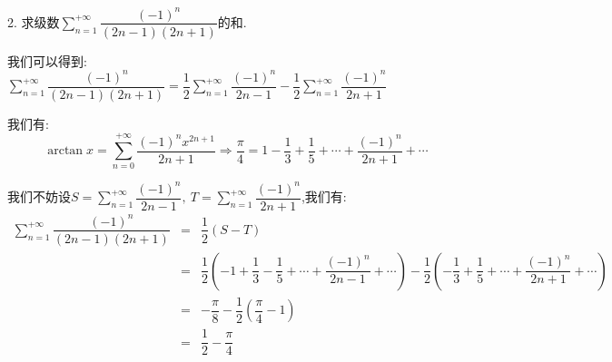 2. 求级数$\sum\limits_{n=1}^{+\infty}\dfrac{(-1)^n}{(2n-1)(2n+1)}$的和.
\begin{solution}
	
	我们可以得到: $\sum\limits_{n=1}^{+\infty}\dfrac{(-1)^n}{(2n-1)(2n+1)}=\dfrac{1}{2}\sum\limits_{n=1}^{+\infty}\dfrac{(-1)^n}{2n-1}-\dfrac{1}{2}\sum\limits_{n=1}^{+\infty}\dfrac{(-1)^n}{2n+1}$
	
	我们有: 
	$$\arctan x=\sum\limits_{n=0}^{+\infty}\dfrac{(-1)^nx^{2n+1}}{2n+1}\Rightarrow \dfrac{\pi}{4}=1-\dfrac{1}{3}+\dfrac{1}{5}+\cdots+\dfrac{(-1)^n}{2n+1}+\cdots$$
	
	我们不妨设$S=\sum\limits_{n=1}^{+\infty}\dfrac{(-1)^n}{2n-1},\ T=\sum\limits_{n=1}^{+\infty}\dfrac{(-1)^n}{2n+1}$,我们有: 
	\begin{eqnarray*}
		\sum\limits_{n=1}^{+\infty}\dfrac{(-1)^n}{(2n-1)(2n+1)}&=&\dfrac{1}{2}(S-T)\\
		&=&\dfrac{1}{2}(-1+\dfrac{1}{3}-\dfrac{1}{5}+\cdots+\dfrac{(-1)^n}{2n-1}+\cdots)-\dfrac{1}{2}(-\dfrac{1}{3}+\dfrac{1}{5}+\cdots+\dfrac{(-1)^n}{2n+1}+\cdots)\\
		&=&-\dfrac{\pi}{8}-\dfrac{1}{2}(\dfrac{\pi}{4}-1)\\
		&=&\dfrac{1}{2}-\dfrac{\pi}{4}
	\end{eqnarray*}
	
\end{solution}
